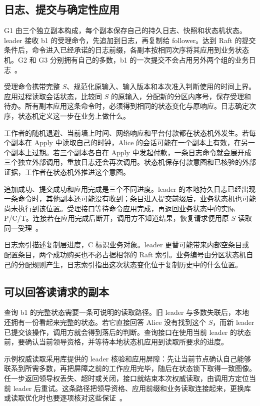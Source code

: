 \subsection*{日志、提交与确定性应用}

G1 由三个独立副本构成，每个副本保存自己的持久日志、快照和状态机状态。leader 接收 b1 的受理命令，先追加到日志，再复制给 follower。达到 Raft 的提交条件后，命令进入已经承诺的日志前缀，各副本按相同次序将其应用到业务状态机。G2 和 G3 分别拥有自己的多数，b1 的一次提交不会占用另外两个组的业务日志~\cite{raft}。

受理命令携带完整 $S$、规范化原输入、输入版本和本次准入判断使用的时间上界。应用过程读取会话状态，比较同 $S$ 的原输入，分配新的分区内序号，保存受理和待办。所有副本应用这条命令时，必须得到相同的状态变化与原响应。日志确定次序，状态机定义这一步在业务上做什么。

工作者的随机退避、当前墙上时间、网络响应和平台付款都在状态机外发生。若每个副本在 Apply 中读取自己的时钟，Alice 的会话可能在一个副本上有效，在另一个副本上过期。若三个副本各自在 Apply 中发起付款，一条日志命令就会展开成三个独立外部调用，重放日志还会再次调用。状态机保存付款意图和已核验的外部证据，工作者在状态机外推进这个意图。


追加成功、提交成功和应用完成是三个不同进度。leader 的本地持久日志已经出现一条命令时，其他副本还可能没有收到；条目进入提交前缀后，业务状态机也可能尚未执行到该位置。受理接口等待命令应用完成，再返回业务状态中的实际 P/C/T。连接若在应用完成后断开，调用方不知道结果，恢复请求便用原 $S$ 读取同一受理~\cite{hashicorp-raft-173}。

日志索引描述复制层进度，C 标识业务对象。leader 更替可能带来内部空条目或配置条目，两个成功购买也不必占据相邻的 Raft 索引。业务编号由分区状态机自己的分配规则产生，日志索引指出这次状态变化位于复制历史中的什么位置。

\subsection*{可以回答读请求的副本}

查询 b1 的完整状态需要一条可说明的读取路径。旧 leader 与多数失联后，本地还拥有一份看起来完整的状态。若它直接回答 Alice 没有找到这个 $S$，而新 leader 已提交该操作，调用方就会得到落后的判断。查询接口在使用当前 leader 的状态前，要确认当前领导资格，并等待本地状态机应用到读取所要求的进度。

示例权威读取采用库提供的 leader 核验和应用屏障：先让当前节点确认自己能够联系到所需多数，再把屏障之前的工作应用完毕，随后在状态锁下取得一致图像。任一步返回领导权丢失、超时或关闭，接口就结束本次权威读取，由调用方定位当前 leader 后重试。这条路径把领导资格、应用前缀和业务读取连接起来，更换库或读取优化时也要逐项核对这些保证~\cite{hashicorp-raft-173}。

